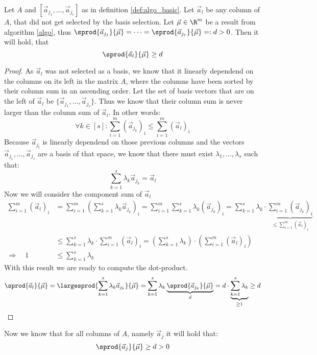 \begin{lemma}
    \label{lemma:non_basis_vecs_greater}
    Let $A$ and $[\vec a_{j_1}, \dots, \vec a_{j_r}]$ as in definition \ref{def:algo_basic}. Let $\vec a_l$ be any column of $A$, that did not get selected by the basis selection. Let $\vec\mu \in \R^m$ be a result from algorithm \ref{algo}, thus $\sprod{\vec a_{j_1}}{\vec\mu} = \dots = \sprod{\vec a_{j_r}}{\vec\mu} =: d > 0$. Then it will hold, that 
    $$\sprod{\vec a_l}{\vec\mu} \geq d$$
\end{lemma}
\begin{proof}
    As $\vec a_l$ was not selected as a basis, we know that it linearly dependend on the columns on its left in the matrix $A$, where the columns have been sorted by their column sum in an ascending order.  Let the set of basis vectors that are on the left of $\vec a_l$ be $\{\vec a_{j_1}, \dots, \vec a_{j_s}\}$. Thus we know that their column sum is never larger than the column sum of $\vec a_l$. In other words:
    $$\forall k \in [s]\colon\sum_{i=1}^{m} \left(\vec a_{j_k}\right)_i \leq \sum_{i=1}^{m} \left(\vec a_l\right)_i$$
    Because $\vec a_{j_l}$ is linearly dependend on those previous columns and the vectors $\vec a_{j_1}, \dots, \vec a_{j_s}$ are a basis of that space, we know that there must exist $\lambda_1, \dots, \lambda_s$ such that:
    $$\sum_{k=1}^{s}\lambda_k \vec a_{j_k} = \vec a_l$$
    Now we will consider the component sum of $\vec a_l$
    \begin{align*}
        \sum_{i=1}^{m} (\vec a_l)_i &= \sum_{i=1}^{m} \left(\sum_{k=1}^{s}\lambda_k \vec a_{j_k}\right)_i = \sum_{i=1}^{m} \sum_{k=1}^{s}\lambda_k \left(\vec a_{j_k}\right)_i = \sum_{k=1}^{s} \lambda_k \cdot\underbrace{\sum_{i=1}^{m} \left(\vec a_{j_k}\right)_i}_{\leq \sum_{i=1}^{m} (\vec a_l)_i}\\
        &\leq \sum_{k=1}^{s} \lambda_k \cdot\sum_{i=1}^{m} (\vec a_l)_i = \left(\sum_{k=1}^{s} \lambda_k\right) \cdot\left(\sum_{i=1}^{m} (\vec a_l)_i\right)\\
        \Rightarrow\quad 1 &\leq \sum_{k=1}^{s} \lambda_k
    \end{align*}
    With this result we are ready to compute the dot-product.
    $$\sprod{\vec a_{l}}{\vec\mu} = \largesprod{\sum_{k=1}^{s}\lambda_k \vec a_{j_k}}{\vec\mu} = \sum_{k=1}^{s}\lambda_k \underbrace{\sprod{\vec a_{j_k}}{\vec\mu}}_d = d\cdot \underbrace{\sum_{k=1}^{s}\lambda_k}_{\geq 1} \geq d$$
\end{proof}
Now we know that for all columns of $A$, namely $\vec a_j$ it will hold that:
$$\sprod{\vec a_j}{\vec\mu} \geq d > 0$$

